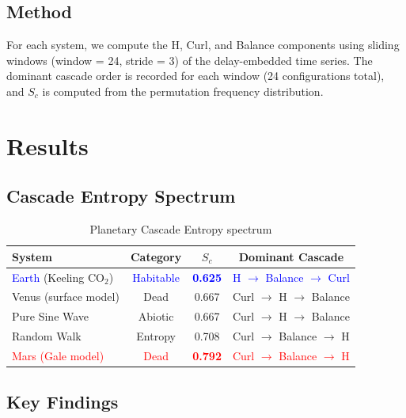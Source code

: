 \documentclass[12pt,a4paper]{article}
\begin{document}
\subsection{Method}

For each system, we compute the H, Curl, and Balance components using
sliding windows (window = 24, stride = 3) of the delay-embedded time
series. The dominant cascade order is recorded for each window (24
configurations total), and $S_c$ is computed from the permutation
frequency distribution.

\section{Results}

\subsection{Cascade Entropy Spectrum}

\begin{table}[htbp]
  \centering
  \caption{Planetary Cascade Entropy spectrum}
  \label{tab:results}
  \begin{tabular}{lccc}
    \toprule
    \textbf{System} & \textbf{Category} & \textbf{$S_c$} &
    \textbf{Dominant Cascade} \\
    \midrule
    \textcolor{blue}{Earth} (Keeling CO$_2$) &
      \textcolor{blue}{Habitable} &
      \textcolor{blue}{\textbf{0.625}} &
      \textcolor{blue}{H $\rightarrow$ Balance $\rightarrow$ Curl} \\
    Venus (surface model) & Dead & 0.667 &
      Curl $\rightarrow$ H $\rightarrow$ Balance \\
    Pure Sine Wave & Abiotic & 0.667 &
      Curl $\rightarrow$ H $\rightarrow$ Balance \\
    Random Walk & Entropy & 0.708 &
      Curl $\rightarrow$ Balance $\rightarrow$ H \\
    \textcolor{red}{Mars (Gale model)} &
      \textcolor{red}{Dead} &
      \textcolor{red}{\textbf{0.792}} &
      \textcolor{red}{Curl $\rightarrow$ Balance $\rightarrow$ H} \\
    \bottomrule
  \end{tabular}
\end{table}

\subsection{Key Findings}
\end{document}
